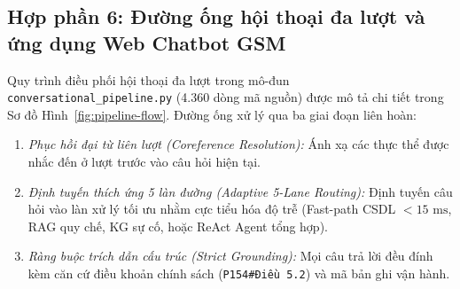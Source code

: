 \documentclass[a4paper,11pt]{article}
\begin{document}
\subsection{Hợp phần 6: Đường ống hội thoại đa lượt và ứng dụng Web Chatbot GSM}
\label{sec:conversational-web}

Quy trình điều phối hội thoại đa lượt trong mô-đun \nolinkurl{conversational_pipeline.py} (4.360 dòng mã nguồn) được mô tả chi tiết trong Sơ đồ Hình~\ref{fig:pipeline-flow}. Đường ống xử lý qua ba giai đoạn liên hoàn:
\begin{enumerate}[leftmargin=1.8em,topsep=2pt,noitemsep]
    \item \textit{Phục hồi đại từ liên lượt (Coreference Resolution):} Ánh xạ các thực thể được nhắc đến ở lượt trước vào câu hỏi hiện tại.
    \item \textit{Định tuyến thích ứng 5 làn đường (Adaptive 5-Lane Routing):} Định tuyến câu hỏi vào làn xử lý tối ưu nhằm cực tiểu hóa độ trễ (Fast-path CSDL $<15\text{ ms}$, RAG quy chế, KG sự cố, hoặc ReAct Agent tổng hợp).
    \item \textit{Ràng buộc trích dẫn cấu trúc (Strict Grounding):} Mọi câu trả lời đều đính kèm căn cứ điều khoản chính sách (\texttt{P154\#Điều 5.2}) và mã bản ghi vận hành.
\end{enumerate}
\end{document}

